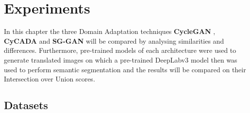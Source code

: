 \chapter{Experiments}
\label{sec:experiments}

In this chapter the three Domain Adaptation techniques \textbf{CycleGAN} \cite{DBLP:journals/corr/ZhuPIE17}, \textbf{CyCADA} \cite{DBLP:journals/corr/abs-1711-03213} and \textbf{SG-GAN} \cite{DBLP:journals/corr/abs-1801-01726} will be compared by analysing similarities and differences. Furthermore, pre-trained models of each architecture were used to generate translated images on which a pre-trained DeepLabv3 \cite{DBLP:journals/corr/ChenPSA17} model then was used to perform semantic segmentation and the results will be compared on their Intersection over Union scores.


\section{Datasets}

